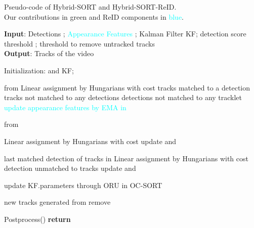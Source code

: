 \documentclass[letterpaper]{article} \usepackage{aaai23}  \usepackage{times}  \usepackage{helvet}  \usepackage{courier}  \usepackage[hyphens]{url}  \usepackage{graphicx} \urlstyle{rm} \def\UrlFont{\rm}  \usepackage{natbib}  \usepackage{caption} \frenchspacing  \setlength{\pdfpagewidth}{8.5in}  \setlength{\pdfpageheight}{11in}  \usepackage{algorithm}
\begin{document}
\begin{algorithm}[H]
\caption{Pseudo-code of Hybrid-SORT and Hybrid-SORT-ReID. \protect\\Our contributions in \textcolor[RGB]{50, 205, 50}{green} and ReID components in \textcolor{cyan}{blue}.}
\label{alg:algorithm}
\textbf{Input}: Detections ; \textcolor{cyan}{Appearance Features }; Kalman Filter KF; detection score threshold ; threshold to remove untracked tracks \\
\textbf{Output}: Tracks {\huge } of the video

\begin{algorithmic}[1] \STATE  Initialization:  {\huge }  and KF;

\STATE {\color{gray}{Step 1: association with high confidence box}} 



\STATE   
\STATE  from {\huge }  {\color{gray}{KF.predect}} 
\STATE   \STATE  \STATE  Linear assignment by Hungarians with cost 
\STATE  {\huge } tracks matched to a detection
\STATE  {\huge } tracks not matched to any detections
\STATE   detections not matched to any tracklet
\STATE  \textcolor{cyan}{update appearance features by EMA in {\huge }} 

\STATE
\STATE  {\color{gray}{Step 2: association with low confidence box in ByteTrack}} 
\STATE   
\STATE   from {\huge }
\STATE      \STATE  

\STATE  Linear assignment by Hungarians with cost 
\STATE  update {\huge } and {\huge }

\STATE
\STATE  {\color{gray}{Step 3: perform OCR to find lost tracks back in OC-SORT}} 
\STATE   last matched detection of tracks in {\huge }
\STATE   \STATE  Linear assignment by Hungarians with cost 
\STATE   detection unmatched to tracks
\STATE  update {\huge } and \ \ {\huge }

\STATE
\STATE  {\color{gray}{Step 4: update states of matched tracks in OC-SORT}} 
\STATE update KF.parameters through ORU in OC-SORT
\ENDFOR

\STATE
\STATE  {\color{gray}{Step 5: initialize and remove tracks}} 
\STATE  {\huge }   new tracks generated from 
\STATE remove  {\huge }  {\huge }
\ENDFOR
\STATE  {\huge }  {\huge } {\huge }

\ENDFOR
\STATE  {\huge }  Postprocess({\huge })  {\color{gray}{[Optional] offline processing}}
\STATE \textbf{return} {\huge }
\end{algorithmic}
\end{algorithm}
\end{document}
